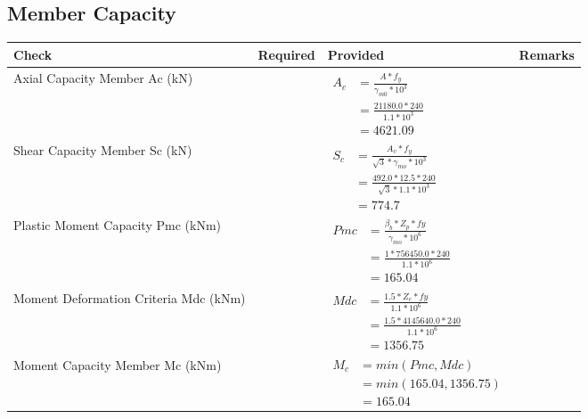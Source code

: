 \documentclass{article}%
\begin{document}
\subsection{Member Capacity}%
\label{subsec:MemberCapacity}%
\renewcommand{\arraystretch}{1.2}%
\begin{longtable}{|p{4cm}|p{5cm}|p{5.5cm}|p{1.5cm}|}%
\hline%
\rowcolor{OsdagGreen}%
Check&Required&Provided&Remarks\\%
\hline%
\endhead%
\hline%
Axial Capacity Member Ac (kN)&&$\begin{aligned} A_c &=\frac{A*f_y}{\gamma_{m0} *10^3}\\ &=\frac{21180.0*240}{1.1* 10^3}\\ &=4621.09\end{aligned}$&\\%
\hline%
Shear Capacity Member Sc (kN)&&$\begin{aligned} S_c &= \frac{A_v*f_y}{\sqrt{3}*\gamma_{mo} *10^3}\\ &=\frac{492.0*12.5*240}{\sqrt{3}*1.1 *10^3}\\ &=774.7\end{aligned}$&\\%
\hline%
Plastic Moment Capacity Pmc (kNm)&&$\begin{aligned} Pmc &= \frac{\beta_b * Z_p *fy}{\gamma_{mo} * 10^6}\\ &=\frac{1*756450.0*240}{1.1 * 10^6}\\ &=165.04\end{aligned}$&\\%
\hline%
Moment Deformation Criteria Mdc (kNm)&&$\begin{aligned} Mdc &= \frac{1.5 *Z_e *fy}{1.1* 10^6}\\ &= \frac{1.5 *4145640.0*240}{1.1* 10^6}\\ &= 1356.75\end{aligned}$&\\%
\hline%
Moment Capacity Member Mc (kNm)&&$\begin{aligned} M_c &= min(Pmc,Mdc)\\ &=min(165.04,1356.75)\\ &=165.04\end{aligned}$&\\%
\hline%
\end{longtable}

%
\newpage%
\end{document}
